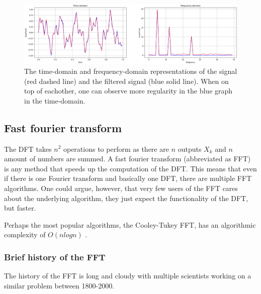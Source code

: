 \begin{figure}[ht]
    \centering
    \includegraphics[width=\textwidth]{./images/filtered_signal.png}
    \caption{The time-domain and frequency-domain representations of the signal (red dashed line) and the filtered signal (blue solid line). When on top of eachother, one can observe more regularity in the blue graph in the time-domain.\label{fig:DFT-IDFT}}
\end{figure}

\subsection{Fast fourier transform}
The DFT takes $n^2$ operations to perform as there are $n$ outputs $X_k$ and $n$ amount of numbers are summed. A fast fourier transform (abbreviated as FFT) is any method that speeds up the computation of the DFT. This means that even if there is one Fourier transform and basically one DFT, there are multiple FFT algorithms. One could argue, however, that very few users of the FFT cares about the underlying algorithm, they just expect the functionality of the DFT, but faster. 

Perhaps the most popular algorithms, the Cooley-Tukey FFT, has an algorithmic complexity of $O(n log n)$ \cite{Randhawa2018} \cite{HeidemanEtAl1984}.

\subsubsection{Brief history of the FFT}
The history of the FFT is long and cloudy with multiple scientists working on a similar problem between 1800-2000. 



